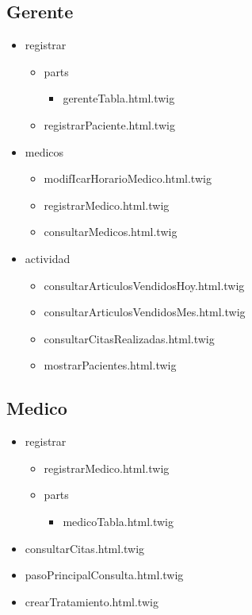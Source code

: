 		\subsection{Gerente}
		\begin{itemize}
			\item registrar
			\begin{itemize}
				\item parts 
				\begin{itemize}
				\item gerenteTabla.html.twig
				\end{itemize}
				\item registrarPaciente.html.twig
			\end{itemize}
			\item medicos 
			\begin{itemize}
			\item modifIcarHorarioMedico.html.twig
			\item registrarMedico.html.twig
			\item consultarMedicos.html.twig
			\end{itemize}
			\item actividad
			\begin{itemize}
				\item consultarArticulosVendidosHoy.html.twig
				\item consultarArticulosVendidosMes.html.twig
				\item consultarCitasRealizadas.html.twig
				\item mostrarPacientes.html.twig
			\end{itemize}
		\end{itemize}
		
		\subsection{Medico}
		\begin{itemize}
			\item registrar
			\begin{itemize}
			\item registrarMedico.html.twig
			\item parts
			\begin{itemize}
				\item medicoTabla.html.twig
			\end{itemize}
			\end{itemize}
			\item consultarCitas.html.twig
			\item pasoPrincipalConsulta.html.twig 
			\item crearTratamiento.html.twig
			
		\end{itemize}

